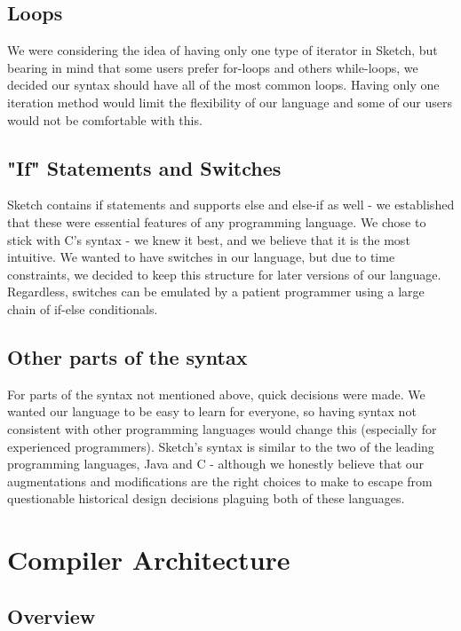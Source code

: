 \documentclass{l3proj}
\begin{document}
\section {Loops}
We were considering the idea of having only one type of iterator in Sketch, but bearing in mind that some users prefer for-loops and others while-loops, we decided our syntax should have all of the most common loops. Having only one iteration method would limit the flexibility of our language and some of our users would not be comfortable with this.
 
\section {"If" Statements and Switches}
Sketch contains if statements and supports else and else-if as well - we established that these were essential features of any programming language. We chose to stick with C's syntax - we knew it best, and we believe that it is the most intuitive. We wanted to have switches in our language, but due to time constraints, we decided to keep this structure for later versions of our language. Regardless, switches can be emulated by a patient programmer using a large chain of if-else conditionals.

\section{Other parts of the syntax}
For parts of the syntax not mentioned above, quick decisions were made. We wanted our language to be easy to learn for everyone, so having syntax not consistent with other programming languages would change this (especially for experienced programmers). Sketch's syntax is similar to the two of the leading programming languages, Java and C - although we honestly believe that our augmentations and modifications are the right choices to make to escape from questionable historical design decisions plaguing both of these languages. 



\chapter{Compiler Architecture}
\label{arch}

\section{Overview}
\label{arch-over}
\end{document}
